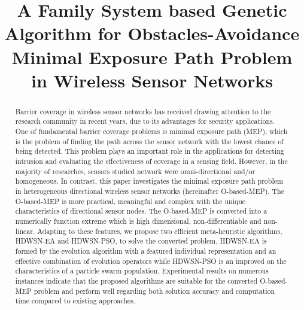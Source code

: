 \documentclass[final]{elsarticle}
\begin{document}
\begin{frontmatter}
\title{A Family System based Genetic Algorithm for  Obstacles-Avoidance Minimal Exposure Path Problem in Wireless Sensor Networks}

%
%
%
\begin{abstract}
Barrier coverage in wireless sensor networks has received drawing attention to the research community in recent years, due to its advantages for security applications. One of fundamental barrier coverage problems is minimal exposure path (MEP), which is the problem of finding the path across the sensor network with the lowest chance of being detected. This problem plays an important role in the applications for detecting intrusion and evaluating the effectiveness of coverage in a sensing field. However, in the majority of researches, sensors studied network were omni-directional and/or homogeneous. In contrast, this paper investigates the minimal exposure path problem in heterogeneous directional wireless sensor networks (hereinafter O-based-MEP). The O-based-MEP is more practical, meaningful and complex with the unique characteristics of directional sensor nodes. The O-based-MEP is converted into a numerically function extreme which is high dimensional, non-differentiable and non-linear. Adapting to these features, we propose two efficient meta-heuristic algorithms, HDWSN-EA and HDWSN-PSO, to solve the converted problem. HDWSN-EA is formed by the evolution algorithm with a featured individual representation and an effective combination of evolution operators while HDWSN-PSO is an improved on the characteristics of a particle swarm population. Experimental results on numerous instances indicate that the proposed algorithms are suitable for the converted O-based-MEP problem and perform well regarding both solution accuracy and computation time compared to existing approaches.
  

\end{abstract}
\end{frontmatter}
\end{document}
